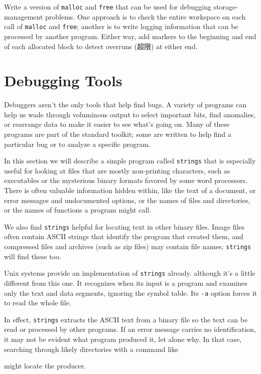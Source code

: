 \begin{exercise}
Write a version of \verb'malloc' and \verb'free' that can be used for
debugging storage-management problems. One approach is to check the entire
workspace on each call of \verb'malloc' and \verb'free'; another is to
write logging information that can be processed by another program. Either
way, add markers to the beginning and end of each allocated block to detect
overruns (超限) at either end.
\end{exercise}

\section{Debugging Tools}

Debuggers aren't the only tools that help find bugs. A variety of programs
can help us wade through voluminous output to select important bits, find
anomalies, or rearrange data to make it easier to see what's going on. Many
of these programs are part of the standard toolkit; some are written to
help find a particular bug or to analyze a specific program.

In this section we will describe a simple program called \verb'strings'
that is especially useful for looking at files that are mostly non-printing
characters, such as executables or the mysterious binary formats favored by
some word processors. There is often valuable information hidden within,
like the text of a document, or error messages and undocumented options, or
the names of files and directories, or the names of functions a program
might call.

We also find \verb'strings' helpful for locating text in other binary
files.  Image files often contain ASCII strings that identify the program
that created them, and compressed files and archives (such as zip files)
may contain file names; \verb'strings' will find these too.

Unix systems provide an implementation of \verb'strings' already. although
it's a little different from this one. It recognizes when its input is a
program and examines only the text and data segments, ignoring the symbol
table. Its \verb'-a' option forces it to read the whole file.

In effect, \verb'strings' extracts the ASCII text from a binary file so the
text can be read or processed by other programs. If an error message
carries no identification, it may not be evident what program produced it,
let alone why. In that case, searching through likely directories with a
command like
\begin{wellcode}
\end{wellcode}
might locate the producer.

